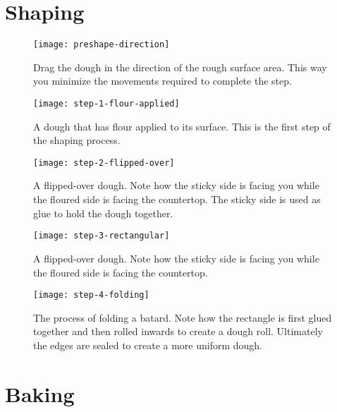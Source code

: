 \documentclass[paper=a4, twoside=false, fontsize=12pt]{scrbook}
\begin{document}
\clearpage{}

\section*{Shaping}
\begin{flowchart}[!htb]

\end{flowchart}

\begin{figure}[!htb]
  \texttt{[image: preshape-direction]}
  \caption[Dragging direction]{Drag the dough in the direction of the rough
      surface area. This way you minimize the movements required to complete
      the step.}%
  \label{fig:preshape-direction}
\end{figure}
\begin{figure}[!htb]
  \texttt{[image: step-1-flour-applied]}
  \caption[Step 1 of shaping process]{A dough that has flour applied to its
      surface. This is the first step of the shaping process.}%
  \label{fig:shaping-flour-surface}
\end{figure}
\begin{figure}[!htb]
  \texttt{[image: step-2-flipped-over]}
  \caption[Step 2 of shaping process]{A flipped-over dough. Note how the
      sticky side is facing you while the floured side is facing the
      countertop.  The sticky side is used as glue to hold the dough together.}
\end{figure}
\begin{figure}[htb!]
  \texttt{[image: step-3-rectangular]}
  \caption[Step 3 of shaping process]{A flipped-over dough. Note how the
      sticky side is facing you while the floured side is facing the
      countertop.}%
  \label{fig:shaping-rectangular-dough}
\end{figure}
\begin{figure}[htb!]
  \texttt{[image: step-4-folding]}
  \caption[Step 4 of shaping process]{The process of folding a batard. Note
      how the rectangle is first glued together and then rolled inwards to
      create a dough roll. Ultimately the edges are sealed to create a more
      uniform dough.}%
  \label{fig:shaping-folding}
\end{figure}
\clearpage{}

\section*{Baking}
\begin{flowchart}[!htb]

\caption*{Summary of bread bakign process}
\end{flowchart}
\end{document}
